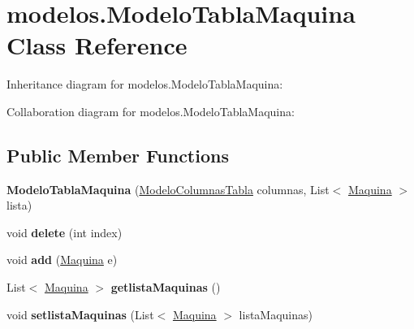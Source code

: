 \hypertarget{classmodelos_1_1_modelo_tabla_maquina}{}\section{modelos.\+Modelo\+Tabla\+Maquina Class Reference}
\label{classmodelos_1_1_modelo_tabla_maquina}


Inheritance diagram for modelos.\+Modelo\+Tabla\+Maquina\+:


Collaboration diagram for modelos.\+Modelo\+Tabla\+Maquina\+:
\subsection*{Public Member Functions}
\begin{DoxyCompactItemize}
\item 
\mbox{\label{classmodelos_1_1_modelo_tabla_maquina_a1a20d87af57c2ec9a090f9f164f616cc}} 
{\bfseries Modelo\+Tabla\+Maquina} (\mbox{\hyperlink{classmodelos_1_1_modelo_columnas_tabla}{Modelo\+Columnas\+Tabla}} columnas, List$<$ \mbox{\hyperlink{classobjetos_1_1_maquina}{Maquina}} $>$ lista)
\item 
\mbox{\label{classmodelos_1_1_modelo_tabla_maquina_aac1f2793dfa5765b8e66c17891753e10}} 
void {\bfseries delete} (int index)
\item 
\mbox{\label{classmodelos_1_1_modelo_tabla_maquina_aa49c15eda1d441b2a17159f0aa80cef4}} 
void {\bfseries add} (\mbox{\hyperlink{classobjetos_1_1_maquina}{Maquina}} e)
\item 
\mbox{\label{classmodelos_1_1_modelo_tabla_maquina_a557771e167f337141e22d3d4a0432b7b}} 
List$<$ \mbox{\hyperlink{classobjetos_1_1_maquina}{Maquina}} $>$ {\bfseries getlista\+Maquinas} ()
\item 
\mbox{\label{classmodelos_1_1_modelo_tabla_maquina_a559a21bd653aa7b639fa598ff22fa5f7}} 
void {\bfseries setlista\+Maquinas} (List$<$ \mbox{\hyperlink{classobjetos_1_1_maquina}{Maquina}} $>$ lista\+Maquinas)
\item 
\mbox{\label{classmodelos_1_1_modelo_tabla_maquina_ab8ce1d5c3842d65c11a8c8cb10f5b7f7}} 

\end{DoxyCompactItemize}
